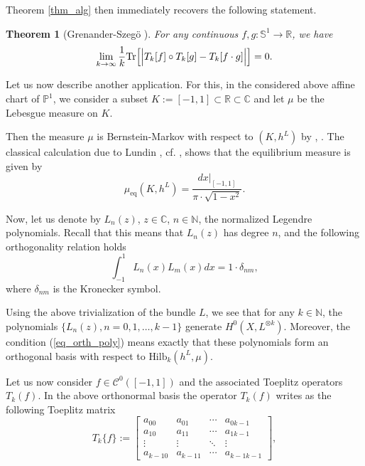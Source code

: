 \documentclass[12pt]{article}
\numberwithin{equation}{section}
\theoremstyle{theorem}
\newtheorem{thm}{Theorem}[section]
\theoremstyle{definition}
\theoremstyle{remark}
\newcommand{\comp}{\mathbb{C}}
\newcommand{\real}{\mathbb{R}}
\newcommand{\nat}{\mathbb{N}}
\newcommand{\ccal}{\mathscr{C}}
\begin{document}
	\par 
	Theorem \ref{thm_alg} then immediately recovers the following statement.
	\begin{thm}[{Grenander-Szeg{\"o} \cite[\S 7, 8]{GrenanSzego}}]
		For any continuous $f, g : \mathbb{S}^1 \to \real$, we have
		\begin{equation}
			\lim_{k \to \infty} \frac{1}{k} {\rm{Tr}} \Big[ \Big| T_k[f] \circ T_k[g] - T_k[f \cdot g] \Big| \Big]
			=
			0.
		\end{equation}
	\end{thm}
	\par 
	Let us now describe another application.
	For this, in the considered above affine chart of $\mathbb{P}^1$, we consider a subset $K := [-1, 1] \subset \real \subset \comp$ and let $\mu$ be the Lebesgue measure on $K$.
	\par 
	Then the measure $\mu$ is Bernstein-Markov with respect to $(K, h^L)$ by \cite[Corollary 1.8]{BerBoucNys}, \cite[Proposition 3.6]{BernsteinMarkovSurvey}.
	The classical calculation due to Lundin \cite{Lundin}, cf. \cite[p. 707]{BedfordTaylorEquil}, shows that the equilibrium measure is given by
	\begin{equation}
		\mu_{\mathrm{eq}}(K, h^L) = \frac{dx|_{[-1, 1]}}{\pi \cdot \sqrt{1 - x^2}}.
	\end{equation}
	\par 
	Now, let us denote by $L_n(z)$, $z \in \comp$, $n \in \nat$, the normalized Legendre polynomials.
	Recall that this means that $L_n(z)$ has degree $n$, and the following orthogonality relation holds
	\begin{equation}\label{eq_orth_poly}
		\int_{-1}^{1} L_n(x) L_m(x) dx = 1 \cdot \delta_{n m},
	\end{equation}
	where $\delta_{n m}$ is the Kronecker symbol.
	\par 
	Using the above trivialization of the bundle $L$, we see that for any $k \in \nat$, the polynomials $\{ L_n(z), n = 0, 1, \ldots, k - 1 \}$ generate $H^0(X, L^{\otimes k})$.
	Moreover, the condition (\ref{eq_orth_poly}) means exactly that these polynomials form an orthogonal basis with respect to ${\textrm{Hilb}}_k(h^L, \mu)$.
	\par 
	Let us now consider $f \in \ccal^0([-1, 1])$ and the associated Toeplitz operators $T_k(f)$.
	In the above orthonormal basis the operator $T_k(f)$ writes as the following Toeplitz matrix 
	\begin{equation}
		T_k\{ f \}
		:=
		\begin{bmatrix}
		a_{0 0} & a_{0 1} & \cdots & a_{0 k - 1} \\
		a_{1 0} & a_{1 1} & \cdots & a_{1 k - 1} \\
		\vdots & \vdots & \ddots & \vdots \\
		a_{k - 1 0} & a_{k-1 1} & \cdots & a_{k-1 k-1}
		\end{bmatrix},
	\end{equation}
\end{document}
